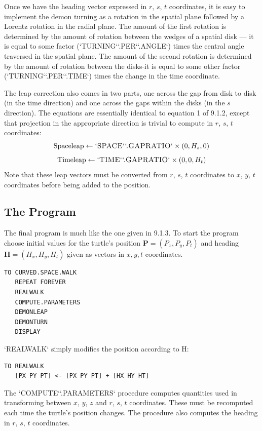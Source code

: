 \documentclass{book}
\begin{document}
Once we have the heading vector expressed in $r$, $s$, $t$ coordinates, it is
easy to implement the demon turning as a rotation in the spatial plane
followed by a Lorentz rotation in the radial plane. The amount of
the first rotation is determined by the amount of rotation between the
wedges of a spatial disk --- it is equal to some factor (\textsc{`TURNING`}\textsc{`.PER`}\textsc{`.ANGLE`})
times the central angle traversed in the spatial plane. The amount of
the second rotation is determined by the amount of rotation between
the disks-it is equal to some other factor (\textsc{`TURNING`}\textsc{`.PER`}\textsc{`.TIME`}) times
the change in the time coordinate.

The leap correction also comes in two parts, one across the gap from
disk to disk (in the time direction) and one across the gaps within the
disks (in the $s$ direction). The equations are essentially identical to
equation 1 of 9.1.2, except that projection in the appropriate direction
is trivial to compute in $r$, $s$, $t$ coordinates:
$$\operatorname{Spaceleap} \leftarrow \text{\textsc{`SPACE`}\textsc{`.GAPRATIO`}}  \times (0, H_s, 0)$$
$$\operatorname{Timeleap} \leftarrow \text{\textsc{`TIME`}\textsc{`.GAPRATIO`}}  \times (0, 0, H_t)$$
Note that these leap vectors must be converted from $r$, $s$, $t$ coordinates
to $x$, $y$, $t$ coordinates before being added to the position.

\subsection{The Program}

The final program is much like the one given in 9.1.3. To start the
program choose initial values for the turtle's position $\mathbf{P} = (P_x, P_y, P_t)$
and heading $\mathbf{H} = (H_x, H_y, H_t)$ given as vectors in $x, y, t$ coordinates.

\begin{verbatim}
TO CURVED.SPACE.WALK
   REPEAT FOREVER
   REALWALK
   COMPUTE.PARAMETERS
   DEMONLEAP
   DEMONTURN
   DISPLAY
\end{verbatim}
\textsc{`REALWALK`} simply modifies the position according to H:

\begin{verbatim}
TO REALWALK
   [PX PY PT] <- [PX PY PT] + [HX HY HT]
\end{verbatim}
The \textsc{`COMPUTE`}\textsc{`.PARAMETERS`} procedure computes quantities used in transforming between $x$, $y$, $z$ and $r$, $s$, $t$ coordinates. These must be recomputed each time the turtle's position changes. The procedure also computes the heading in $r$, $s$, $t$ coordinates.
\end{document}
